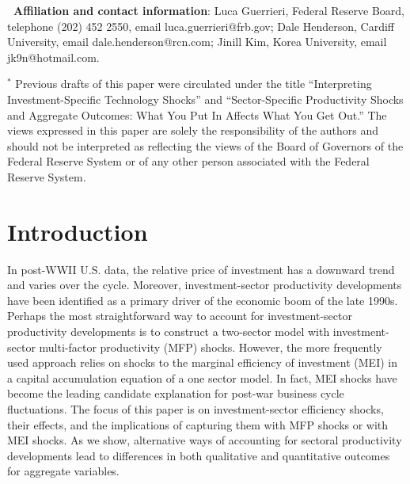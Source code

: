 \documentclass[12pt,fleqn]{article}
\renewcommand{\baselinestretch}{1.5}
\begin{document}
\renewcommand{\baselinestretch}{1} {\footnotesize \noindent }

{\footnotesize \textbf{\ Affiliation and contact information}: Luca
Guerrieri, Federal Reserve Board, telephone (202) 452 2550, email
luca.guerrieri@frb.gov; Dale Henderson, Cardiff University, email
dale.henderson@rcn.com; Jinill Kim, Korea University, email
jk9n@hotmail.com. }

{\footnotesize \vspace{2cm} }

{\footnotesize \noindent $^{*}$ Previous drafts of this paper were
circulated under the title ``Interpreting Investment-Specific Technology
Shocks'' and ``Sector-Specific Productivity Shocks and Aggregate Outcomes: What You Put In Affects What You Get Out.'' The views expressed in this paper are solely the responsibility of
the authors and should not be interpreted as reflecting the views of the
Board of Governors of the Federal Reserve System or of any other person
associated with the Federal Reserve System.  }

\clearpage \renewcommand{\baselinestretch}{1.5} \normalsize

\section{\protect\normalsize Introduction}

In post-WWII U.S. data, the relative price of investment has a downward trend and varies over the cycle. Moreover, investment-sector productivity developments have been identified as a primary driver of the economic boom of the late 1990s. Perhaps the most
straightforward way to account for investment-sector productivity developments is to construct a two-sector
model with investment-sector multi-factor productivity (MFP) shocks. However, the more frequently used approach relies on shocks to the marginal efficiency of investment (MEI) in a capital accumulation equation of a one sector model.
In fact, MEI shocks have become the leading candidate explanation for post-war business
cycle fluctuations.
The focus of this paper is on
investment-sector efficiency shocks, their effects, and the implications of capturing them with MFP shocks or with MEI shocks. As we show, alternative ways of accounting for sectoral productivity developments lead to
differences in both qualitative and quantitative outcomes for aggregate
variables.
\end{document}
